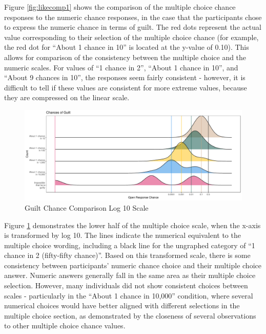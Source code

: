 \documentclass[print]{nuthesis}
\begin{document}
Figure \ref{fig:likecomp1} shows the comparison of the multiple choice chance responses to the numeric chance responses, in the case that the participants chose to express the numeric chance in terms of guilt.
The red dots represent the actual value corresponding to their selection of the multiple choice chance (for example, the red dot for ``About 1 chance in 10'' is located at the y-value of 0.10).
This allows for comparison of the consistency between the multiple choice and the numeric scales.
For values of ``1 chance in 2'', ``About 1 chance in 10'', and ``About 9 chances in 10'', the responses seem fairly consistent - however, it is difficult to tell if these values are consistent for more extreme values, because they are compressed on the linear scale.

\begin{figure}

{\centering \includegraphics[width=\linewidth]{thesis_files/figure-latex/likecomp1scale-1} 

}

\caption{Guilt Chance Comparison Log 10 Scale}\label{fig:likecomp1scale}
\end{figure}

Figure \ref{fig:likecomp1scale} demonstrates the lower half of the multiple choice scale, when the x-axis is transformed by log 10.
The lines indicate the numerical equivalent to the multiple choice wording, including a black line for the ungraphed category of ``1 chance in 2 (fifty-fifty chance)''.
Based on this transformed scale, there is some consistency between participants' numeric chance choice and their multiple choice answer.
Numeric answers generally fall in the same area as their multiple choice selection.
However, many individuals did not show consistent choices between scales - particularly in the ``About 1 chance in 10,000'' condition, where several numerical choices would have better aligned with different selections in the multiple choice section, as demonstrated by the closeness of several observations to other multiple choice chance values.
\end{document}
